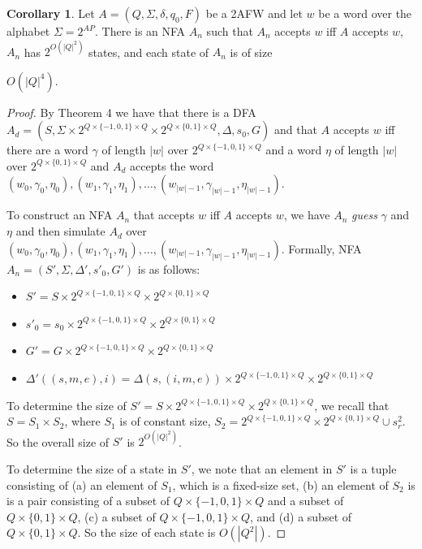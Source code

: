 \documentclass[10pt,a4paper]{amsart}
\theoremstyle{plain}
\theoremstyle{definition}
\newtheorem{corollary}[thm]{Corollary}
\theoremstyle{definition}
\DeclareMathOperator{\?}{?}
\begin{document}
\begin{corollary}
Let $A= (Q,\Sigma,\delta,q_0,F)$ be a 2AFW and let $w$ be a word over the alphabet $\Sigma = 2^{AP}$. There is an NFA $A_n$
such that $A_n$ accepts $w$ iff $A$ accepts $w$, $A_n$ has $2^{O(|Q|^2)}$ states, and each state of $A_n$ is of size

$O(|Q|^4)$.
\end{corollary}
\begin{proof}



By Theorem 4 we have that there is a DFA $A_d = (S,\Sigma \times 2^{Q \times \{-1,0,1\} \times Q} \times 2^{Q \times \{0,1\} \times Q},\Delta,\allowbreak s_0,G)$ and that $A$ accepts $w$ iff there are a word $\gamma$ of length $|w|$ over $2^{Q \times \{-1,0,1\} \times Q}$ and a word $\eta$ of length $|w|$ over $2^{Q \times \{0,1\} \times Q}$ and $A_d$ accepts the word $(w_0, \gamma_0, \eta_0),(w_1,\gamma_1,\eta_1), \ldots,\allowbreak (w_{|w|-1},\gamma_{|w|-1},\eta_{|w|-1})$.


To construct an NFA $A_n$ that accepts $w$ iff $A$ accepts $w$, we have $A_n$ \emph{guess} $\gamma$ and $\eta$ and then simulate $A_d$ over $(w_0, \gamma_0, \eta_0),(w_1,\gamma_1,\eta_1),\ldots,(w_{|w|-1}, \gamma_{|w|-1},\eta_{|w|-1})$.
Formally, NFA $A_n = (S',\Sigma, \Delta',s'_0,G')$ is as follows:
\begin{itemize}
    \item $S' = S \times 2^{Q \times \{-1,0,1\} \times Q} \times 2^{Q \times \{0,1\} \times Q}$

    \item $s'_0 = s_0 \times 2^{Q \times \{-1,0,1\} \times Q} \times 2^{Q \times \{0,1\} \times Q}$

    \item $G' = G \times 2^{Q \times \{-1,0,1\} \times Q} \times 2^{Q \times \{0,1\} \times Q}$

    \item $\Delta'((s,m,e),i) = \Delta(s,(i,m,e)) \times 2^{Q \times \{-1,0,1\} \times Q} \times 2^{Q \times \{0,1\} \times Q}$
\end{itemize}

To determine the size of $S' = S \times 2^{Q \times \{-1,0,1\} \times Q} \times 2^{Q \times \{0,1\} \times Q}$, we recall that $S = S_1 \times S_2$, where $S_1$ is of constant size, $S_2 = 2^{Q \times \{-1,0,1\} \times Q} \times 2^{Q \times \{0,1\} \times Q} \cup s^2_r$. So the overall size of $S'$ is $2^{O(|Q|^2)}$.

To determine the size of a state in $S'$, we note that an element in $S'$ is a tuple consisting of (a) an element of $S_1$, which is a fixed-size set, (b) an element of $S_2$ is is a pair consisting of a subset of $Q \times \{-1,0,1\} \times Q$ and a subset of  $Q \times \{0,1\} \times Q$, (c) a subset of $Q \times \{-1,0,1\} \times Q$, and (d) a subset of $Q \times \{0,1\} \times Q$. So the size of each state is $O(|Q^2|)$.
\end{proof}
\end{document}
